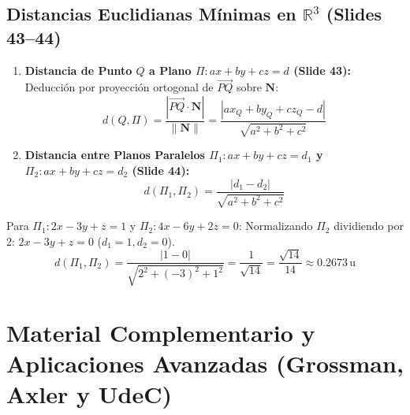 \documentclass[10pt,letterpaper]{article}
\newcommand{\vn}{\mathbf{N}}
\begin{document}
\subsection{\texorpdfstring{Distancias Euclidianas Mínimas en $\mathbb{R}^3$ (Slides 43--44)}{Distancias Euclidianas Mínimas en R3 (Slides 43--44)}}
\begin{enumerate}
    \item \textbf{Distancia de Punto $Q$ a Plano $\Pi: ax+by+cz=d$ (Slide 43):}
    Deducción por proyección ortogonal de $\overrightarrow{PQ}$ sobre $\vn$:
    \[
    d(Q, \Pi) = \frac{|\overrightarrow{PQ} \cdot \vn|}{\|\vn\|} = \frac{|ax_Q + by_Q + cz_Q - d|}{\sqrt{a^2 + b^2 + c^2}}
    \]
    \item \textbf{Distancia entre Planos Paralelos $\Pi_1: ax+by+cz=d_1$ y $\Pi_2: ax+by+cz=d_2$ (Slide 44):}
    \[
    d(\Pi_1, \Pi_2) = \frac{|d_1 - d_2|}{\sqrt{a^2 + b^2 + c^2}}
    \]
\end{enumerate}

\begin{cajaEjemplo}
Para $\Pi_1: 2x - 3y + z = 1$ y $\Pi_2: 4x - 6y + 2z = 0$:
Normalizando $\Pi_2$ dividiendo por 2: $2x - 3y + z = 0$ ($d_1 = 1, d_2 = 0$).
\[
d(\Pi_1, \Pi_2) = \frac{|1 - 0|}{\sqrt{2^2 + (-3)^2 + 1^2}} = \frac{1}{\sqrt{14}} = \frac{\sqrt{14}}{14} \approx 0.2673\,\text{u}
\]
\end{cajaEjemplo}

\section{Material Complementario y Aplicaciones Avanzadas (Grossman, Axler y UdeC)}
\end{document}
